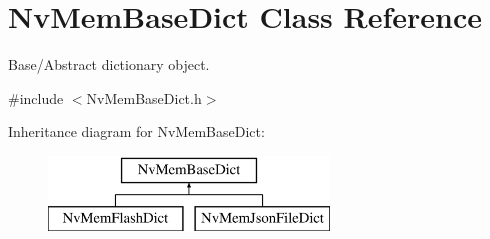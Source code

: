 \hypertarget{class_nv_mem_base_dict}{}\section{Nv\+Mem\+Base\+Dict Class Reference}
\label{class_nv_mem_base_dict}


Base/\+Abstract dictionary object.  




{\ttfamily \#include $<$Nv\+Mem\+Base\+Dict.\+h$>$}

Inheritance diagram for Nv\+Mem\+Base\+Dict\+:\begin{figure}[H]
\begin{center}
\leavevmode
\includegraphics[height=2.000000cm]{class_nv_mem_base_dict}
\end{center}
\end{figure}
